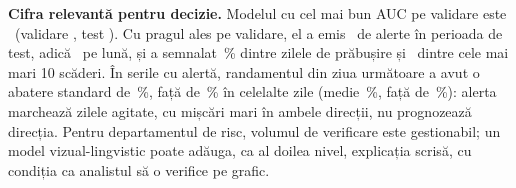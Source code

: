%
{\textbf{Cifra relevantă pentru decizie.} Modelul cu cel mai bun AUC pe validare este \Nbest\ (validare \NbestAUCval, test \NbestAUC). Cu pragul ales pe validare, el a emis \Nalerts\ de alerte în perioada de test, adică \NperMonth\ pe lună, și a semnalat \Ncaught\,\% dintre zilele de prăbușire și \NworstCaught\ dintre cele mai mari 10 scăderi.
În serile cu alertă, randamentul din ziua următoare a avut o abatere standard de \NsdAlert\,\%, față de \NsdQuiet\,\% în celelalte zile (medie \NretAlert\,\%, față de \NretQuiet\,\%): alerta marchează zilele agitate, cu mișcări mari în ambele direcții, nu prognozează direcția.
Pentru departamentul de risc, volumul de verificare este gestionabil; un model vizual-lingvistic poate adăuga, ca al doilea nivel, explicația scrisă, cu condiția ca analistul să o verifice pe grafic.}

